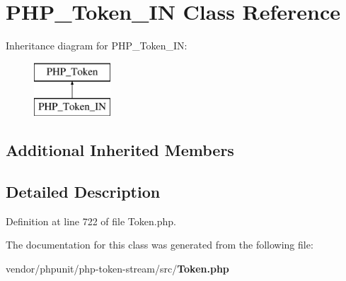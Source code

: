 \section{P\+H\+P\+\_\+\+Token\+\_\+\+I\+N Class Reference}
\label{class_p_h_p___token___i_n}
Inheritance diagram for P\+H\+P\+\_\+\+Token\+\_\+\+I\+N\+:\begin{figure}[H]
\begin{center}
\leavevmode
\includegraphics[height=2.000000cm]{class_p_h_p___token___i_n}
\end{center}
\end{figure}
\subsection*{Additional Inherited Members}


\subsection{Detailed Description}


Definition at line 722 of file Token.\+php.



The documentation for this class was generated from the following file\+:\begin{DoxyCompactItemize}
\item 
vendor/phpunit/php-\/token-\/stream/src/{\bf Token.\+php}\end{DoxyCompactItemize}
